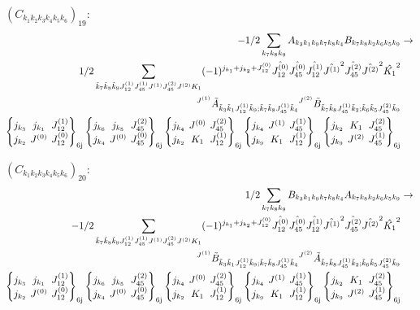\documentclass[11pt]{article}
\newcommand{\sixj}[6]{\begingroup\setlength{\arraycolsep}{0.2em}\begin{Bmatrix} #1 & #2 & #3 \\ #4 & #5 & #6 \end{Bmatrix}_{\text{6j}}\endgroup}
\begin{document}
$\left({C}_{{k}_{1}{k}_{2}{k}_{3}{k}_{4}{k}_{5}{k}_{6}}\right)_{19}$:
\begin{align}
-1/2\sum_{{k}_{7}{k}_{8}{k}_{9}}{A}_{{k}_{3}{k}_{1}{k}_{9}{k}_{7}{k}_{8}{k}_{4}}{B}_{{k}_{7}{k}_{8}{k}_{2}{k}_{6}{k}_{5}{k}_{9}}&\rightarrow \notag \\1/2\sum_{\tilde{k}_{7}\tilde{k}_{8}\tilde{k}_{9}J^{(1)}_{12}J^{(1)}_{45}J^{(1)}J^{(2)}_{45}J^{(2)}K_{1}}(-1)^{j_{{k}_{1}} +j_{{k}_{2}} +J^{(0)}_{12} }\hat{J^{(0)}_{12}}\hat{J^{(0)}_{45}}\hat{J^{(1)}_{12}}\hat{J^{(1)}}^{2}\hat{J^{(2)}_{45}}\hat{J^{(2)}}^{2}\hat{K_{1}}^{2}& \notag \\{}^{J^{(1)}}\tilde{A}_{\tilde{k}_{3}\tilde{k}_{1}J^{(1)}_{12}\tilde{k}_{9};\tilde{k}_{7}\tilde{k}_{8}J^{(1)}_{45}\tilde{k}_{4}}{}^{J^{(2)}}\tilde{B}_{\tilde{k}_{7}\tilde{k}_{8}J^{(1)}_{45}\tilde{k}_{2};\tilde{k}_{6}\tilde{k}_{5}J^{(2)}_{45}\tilde{k}_{9}}& \notag \\\sixj{j_{{k}_{3}}}{j_{{k}_{1}}}{J^{(1)}_{12}}{j_{{k}_{2}}}{J^{(0)}}{J^{(0)}_{12}}\sixj{j_{{k}_{6}}}{j_{{k}_{5}}}{J^{(2)}_{45}}{j_{{k}_{4}}}{J^{(0)}}{J^{(0)}_{45}}\sixj{j_{{k}_{4}}}{J^{(0)}}{J^{(2)}_{45}}{j_{{k}_{2}}}{K_{1}}{J^{(1)}_{12}}\sixj{j_{{k}_{4}}}{J^{(1)}}{J^{(1)}_{45}}{j_{{k}_{9}}}{K_{1}}{J^{(1)}_{12}}\sixj{j_{{k}_{2}}}{K_{1}}{J^{(2)}_{45}}{j_{{k}_{9}}}{J^{(2)}}{J^{(1)}_{45}}
\end{align}

$\left({C}_{{k}_{1}{k}_{2}{k}_{3}{k}_{4}{k}_{5}{k}_{6}}\right)_{20}$:
\begin{align}
1/2\sum_{{k}_{7}{k}_{8}{k}_{9}}{B}_{{k}_{3}{k}_{1}{k}_{9}{k}_{7}{k}_{8}{k}_{4}}{A}_{{k}_{7}{k}_{8}{k}_{2}{k}_{6}{k}_{5}{k}_{9}}&\rightarrow \notag \\-1/2\sum_{\tilde{k}_{7}\tilde{k}_{8}\tilde{k}_{9}J^{(1)}_{12}J^{(1)}_{45}J^{(1)}J^{(2)}_{45}J^{(2)}K_{1}}(-1)^{j_{{k}_{1}} +j_{{k}_{2}} +J^{(0)}_{12} }\hat{J^{(0)}_{12}}\hat{J^{(0)}_{45}}\hat{J^{(1)}_{12}}\hat{J^{(1)}}^{2}\hat{J^{(2)}_{45}}\hat{J^{(2)}}^{2}\hat{K_{1}}^{2}& \notag \\{}^{J^{(1)}}\tilde{B}_{\tilde{k}_{3}\tilde{k}_{1}J^{(1)}_{12}\tilde{k}_{9};\tilde{k}_{7}\tilde{k}_{8}J^{(1)}_{45}\tilde{k}_{4}}{}^{J^{(2)}}\tilde{A}_{\tilde{k}_{7}\tilde{k}_{8}J^{(1)}_{45}\tilde{k}_{2};\tilde{k}_{6}\tilde{k}_{5}J^{(2)}_{45}\tilde{k}_{9}}& \notag \\\sixj{j_{{k}_{3}}}{j_{{k}_{1}}}{J^{(1)}_{12}}{j_{{k}_{2}}}{J^{(0)}}{J^{(0)}_{12}}\sixj{j_{{k}_{6}}}{j_{{k}_{5}}}{J^{(2)}_{45}}{j_{{k}_{4}}}{J^{(0)}}{J^{(0)}_{45}}\sixj{j_{{k}_{4}}}{J^{(0)}}{J^{(2)}_{45}}{j_{{k}_{2}}}{K_{1}}{J^{(1)}_{12}}\sixj{j_{{k}_{4}}}{J^{(1)}}{J^{(1)}_{45}}{j_{{k}_{9}}}{K_{1}}{J^{(1)}_{12}}\sixj{j_{{k}_{2}}}{K_{1}}{J^{(2)}_{45}}{j_{{k}_{9}}}{J^{(2)}}{J^{(1)}_{45}}
\end{align}
\end{document}
